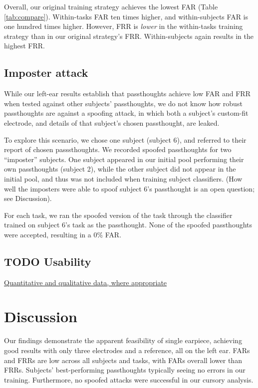 \documentclass[letterpaper,twocolumn,10pt]{article}
\begin{document}
Overall, our original training strategy achieves the lowest FAR (Table \ref{tab:compare}). Within-tasks FAR ten times higher, and within-subjects FAR is one hundred times higher.
However, FRR is \textit{lower} in the within-tasks training strategy than in our original strategy's FRR. Within-subjects again results in the highest FRR.

\subsection{Imposter attack}

While our left-ear results establish that passthoughts achieve low FAR and FRR when tested against other subjects' passthoughts, we do not know how robust passthoughts are against a spoofing attack, in which both a subject's custom-fit electrode, and details of that subject's chosen passthought, are leaked. 

To explore this scenario, we chose one subject (subject 6), and referred to their report of chosen passsthoughts. We recorded spoofed passthoughts for two ``imposter'' subjects. One subject appeared in our initial pool performing their own passthoughts (subject 2), while the other subject did not appear in the initial pool, and thus was not included when training subject classifiers. (How well the imposters were able to spoof subject 6's passthought is an open question; see Discussion).

For each task, we ran the spoofed version of the task through the classifier trained on subject 6's task as the passthought.
None of the spoofed passthoughts were accepted, resulting in a 0\% FAR.


\subsection{{\bfseries\sffamily TODO} Usability}
\label{sec:org18d5968}

\underline{Quantitative and qualitative data, where appropriate}

\section{Discussion}

Our findings demonstrate the apparent feasibility of single earpiece, achieving good results with only three electrodes and a reference, all on the left ear. FARs and FRRs are low across all subjects and tasks, with FARs overall lower than FRRs. Subjects' best-performing passthoughts typically seeing no errors in our training. Furthermore, no spoofed attacks were successful in our cursory analysis.
\end{document}
